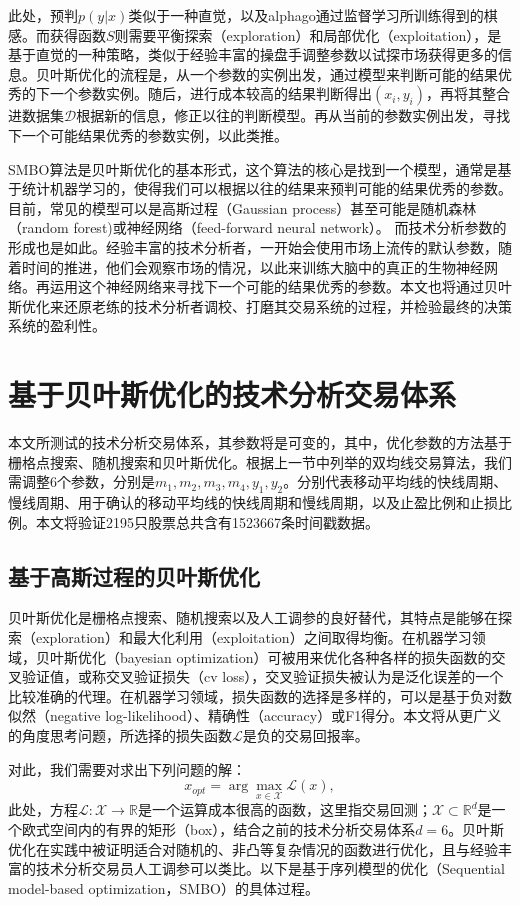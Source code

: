 \documentclass[twoside,longtitle]{LZUthesis}
\begin{document}
此处，预判$p(y|x)$类似于一种直觉，以及alphago通过监督学习所训练得到的棋感。而获得函数$S$则需要平衡探索（exploration）和局部优化（exploitation），是基于直觉的一种策略，类似于经验丰富的操盘手调整参数以试探市场获得更多的信息。贝叶斯优化的流程是，从一个参数的实例出发，通过模型来判断可能的结果优秀的下一个参数实例。随后，进行成本较高的结果判断得出$(x_i,y_i)$，再将其整合进数据集$\mathcal{D}$根据新的信息，修正以往的判断模型。再从当前的参数实例出发，寻找下一个可能结果优秀的参数实例，以此类推。

SMBO算法是贝叶斯优化的基本形式，这个算法的核心是找到一个模型，通常是基于统计机器学习的，使得我们可以根据以往的结果来预判可能的结果优秀的参数。目前，常见的模型可以是高斯过程（Gaussian process）甚至可能是随机森林（random forest)或神经网络（feed-forward neural network）。
而技术分析参数的形成也是如此。经验丰富的技术分析者，一开始会使用市场上流传的默认参数，随着时间的推进，他们会观察市场的情况，以此来训练大脑中的真正的生物神经网络。再运用这个神经网络来寻找下一个可能的结果优秀的参数。本文也将通过贝叶斯优化来还原老练的技术分析者调校、打磨其交易系统的过程，并检验最终的决策系统的盈利性。

\section{基于贝叶斯优化的技术分析交易体系}
本文所测试的技术分析交易体系，其参数将是可变的，其中，优化参数的方法基于栅格点搜索、随机搜索和贝叶斯优化。根据上一节中列举的双均线交易算法，我们需调整6个参数，分别是$m_1,m_2,m_3,m_4,y_1,y_2$。分别代表移动平均线的快线周期、慢线周期、用于确认的移动平均线的快线周期和慢线周期，以及止盈比例和止损比例。本文将验证2195只股票总共含有1523667条时间戳数据。

\subsection{基于高斯过程的贝叶斯优化}
贝叶斯优化\cite{Pelikan2005Bayesian}是栅格点搜索、随机搜索以及人工调参的良好替代，其特点是能够在探索（exploration）和最大化利用（exploitation）之间取得均衡。在机器学习领域，贝叶斯优化（bayesian optimization）可被用来优化各种各样的损失函数的交叉验证值，或称交叉验证损失（cv loss），交叉验证损失被认为是泛化误差的一个比较准确的代理\cite{Arlot2009A}。在机器学习领域，损失函数的选择是多样的，可以是基于负对数似然（negative log-likelihood）、精确性（accuracy）或F1得分。本文将从更广义的角度思考问题，所选择的损失函数$\mathcal{L}$是负的交易回报率。

对此，我们需要对求出下列问题的解：
\begin{equation}
x_{opt}=\arg\max_{x\in\mathcal{X}}\mathcal{L}(x),
\end{equation}
此处，方程$\mathcal{L}:\mathcal{X}\rightarrow\mathbb{R}$是一个运算成本很高的函数，这里指交易回测；$\mathcal{X}\subset \mathbb{R}^d$是一个欧式空间内的有界的矩形（box），结合之前的技术分析交易体系$d=6$。贝叶斯优化在实践中被证明适合对随机的、非凸等复杂情况的函数进行优化，且与经验丰富的技术分析交易员人工调参可以类比。以下是基于序列模型的优化（Sequential model-based optimization，SMBO）的具体过程。
\end{document}
